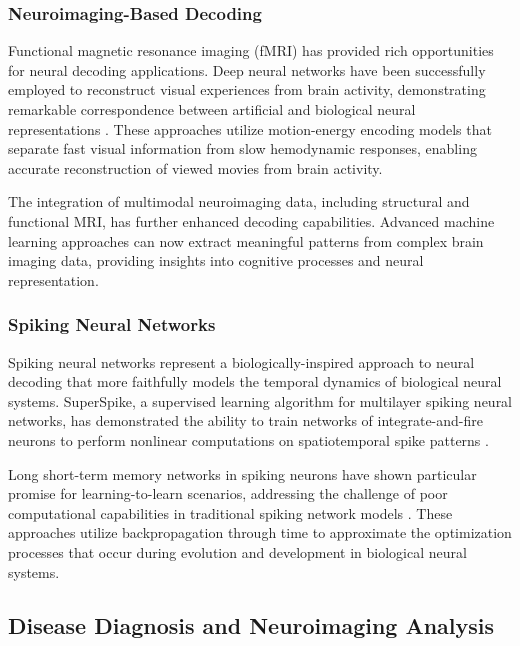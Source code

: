 \documentclass[conference]{IEEEtran}
\begin{document}
\subsubsection{Neuroimaging-Based Decoding}

Functional magnetic resonance imaging (fMRI) has provided rich opportunities for neural decoding applications. Deep neural networks have been successfully employed to reconstruct visual experiences from brain activity, demonstrating remarkable correspondence between artificial and biological neural representations \citep{mathisDecodingBrainNeural2024}. These approaches utilize motion-energy encoding models that separate fast visual information from slow hemodynamic responses, enabling accurate reconstruction of viewed movies from brain activity.

The integration of multimodal neuroimaging data, including structural and functional MRI, has further enhanced decoding capabilities. Advanced machine learning approaches can now extract meaningful patterns from complex brain imaging data, providing insights into cognitive processes and neural representation.

\subsubsection{Spiking Neural Networks}

Spiking neural networks represent a biologically-inspired approach to neural decoding that more faithfully models the temporal dynamics of biological neural systems. SuperSpike, a supervised learning algorithm for multilayer spiking neural networks, has demonstrated the ability to train networks of integrate-and-fire neurons to perform nonlinear computations on spatiotemporal spike patterns \citep{zenkeSuperSpikeSupervisedLearning2018}.

Long short-term memory networks in spiking neurons have shown particular promise for learning-to-learn scenarios, addressing the challenge of poor computational capabilities in traditional spiking network models \citep{bellecLongShorttermMemory2018}. These approaches utilize backpropagation through time to approximate the optimization processes that occur during evolution and development in biological neural systems.

\subsection{Disease Diagnosis and Neuroimaging Analysis}
\end{document}

